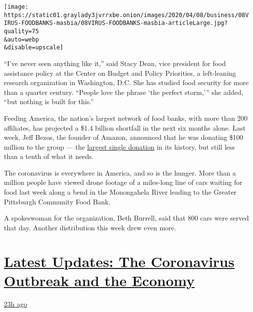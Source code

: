 \texttt{[image: https://static01.graylady3jvrrxbe.onion/images/2020/04/08/business/08VIRUS-FOODBANKS-masbia/08VIRUS-FOODBANKS-masbia-articleLarge.jpg?quality=75\\\&auto=webp\\\&disable=upscale]}

``I've never seen anything like it,'' said Stacy Dean, vice president
for food assistance policy at the Center on Budget and Policy
Priorities, a left-leaning research organization in Washington, D.C. She
has studied food security for more than a quarter century. ``People love
the phrase `the perfect storm,''' she added, ``but nothing is built for
this.''

Feeding America, the nation's largest network of food banks, with more
than 200 affiliates, has projected a \$1.4 billion shortfall in the next
six months alone. Last week, Jeff Bezos, the founder of Amazon,
announced that he was donating \$100 million to the group --- the
\href{https://www.feedingamerica.org/about-us/press-room/jeff-bezos-support-food-banks}{largest
single donation} in its history, but still less than a tenth of what it
needs.

The coronavirus is everywhere in America, and so is the hunger. More
than a million people have viewed drone footage of a miles-long line of
cars waiting for food last week along a bend in the Monongahela River
leading to the Greater Pittsburgh Community Food Bank.

A spokeswoman for the organization, Beth Burrell, said that 800 cars
were served that day. Another distribution this week drew even more.

\hypertarget{latest-updates-the-coronavirus-outbreak-and-the-economy}{%
\section{\texorpdfstring{\href{https://www.nytimes3xbfgragh.onion/live/2020/09/11/business/stock-market-today-coronavirus?action=click\&pgtype=Article\&state=default\&region=MAIN_CONTENT_1\&context=storylines_live_updates}{Latest
Updates: The Coronavirus Outbreak and the
Economy}}{Latest Updates: The Coronavirus Outbreak and the Economy}}\label{latest-updates-the-coronavirus-outbreak-and-the-economy}}

\href{https://www.nytimes3xbfgragh.onion/live/2020/09/11/business/stock-market-today-coronavirus?action=click\&pgtype=Article\&state=default\&region=MAIN_CONTENT_1\&context=storylines_live_updates\#the-nyse-may-move-its-data-center-out-of-new-jersey-in-response-to-a-proposed-tax}{23h
ago}

